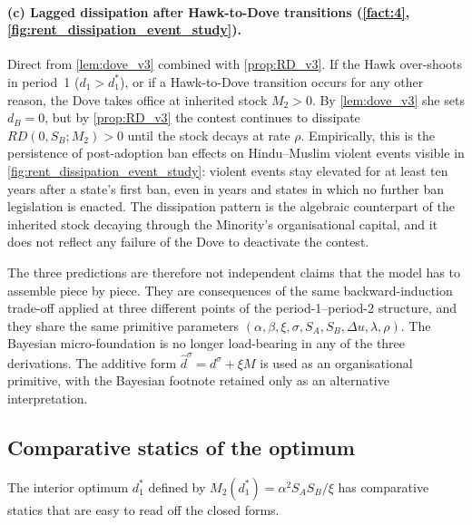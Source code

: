\documentclass[11pt,twoside]{extarticle}
\begin{document}
\paragraph{(c) Lagged dissipation after Hawk-to-Dove transitions (\autoref{fact:4}, \autoref{fig:rent_dissipation_event_study}).} Direct from \autoref{lem:dove_v3} combined with \autoref{prop:RD_v3}. If the Hawk over-shoots in period~1 ($d_1>d_1^*$), or if a Hawk-to-Dove transition occurs for any other reason, the Dove takes office at inherited stock $M_2>0$. By \autoref{lem:dove_v3} she sets $d_B=0$, but by \autoref{prop:RD_v3} the contest continues to dissipate $RD(0,S_B;M_2)>0$ until the stock decays at rate $\rho$. Empirically, this is the persistence of post-adoption ban effects on Hindu--Muslim violent events visible in \autoref{fig:rent_dissipation_event_study}: violent events stay elevated for at least ten years after a state's first ban, even in years and states in which no further ban legislation is enacted. The dissipation pattern is the algebraic counterpart of the inherited stock decaying through the Minority's organisational capital, and it does not reflect any failure of the Dove to deactivate the contest.

The three predictions are therefore not independent claims that the model has to assemble piece by piece. They are consequences of the same backward-induction trade-off applied at three different points of the period-1--period-2 structure, and they share the same primitive parameters $(\alpha,\beta,\xi,\sigma,S_A,S_B,\Delta u,\lambda,\rho)$. The Bayesian micro-foundation is no longer load-bearing in any of the three derivations. The additive form $\hat d^\sigma=d^\sigma+\xi M$ is used as an organisational primitive, with the Bayesian footnote retained only as an alternative interpretation.

\subsection{Comparative statics of the optimum}\label{subsec:cs_optimum_v3}

The interior optimum $d_1^*$ defined by $M_2(d_1^*)=\alpha^2 S_A S_B/\xi$ has comparative statics that are easy to read off the closed forms.
\end{document}
